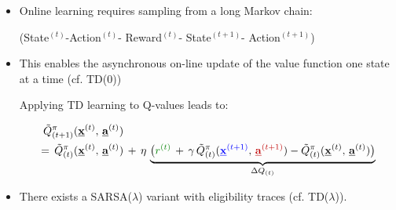 \begin{frame}\frametitle{\subsecname}
	\begin{itemize}
		\item Online learning requires sampling from a long Markov chain:\\
		\begin{center}
			(State$^{(t)}$-Action$^{(t)}$-{\color{reward} Reward$^{(t)}$}-{\color{trans} State$^{(t+1)}$}-{\color{policy} Action$^{(t+1)}$})
		\end{center}
		\vspace{2mm}
		\item This enables the asynchronous on-line update of the value function one state at a time (cf. TD($0$))
		
		\slidesonly{\vspace{-7mm}}
		
		\slidesonly{\vspace{-3mm}}
	
		Applying TD learning to Q-values leads to:
		
		\slidesonly{\vspace{-4mm}}
	
		\begin{align}
			\tilde{Q}^\pi_{(t+1)}(\vec x^{(t)},\, \vec a^{(t)} ) &\\
			 = \, \tilde{Q}^\pi_{(t)} ( \vec x^{(t)},\, \vec a^{(t)} )& \, + \, \eta \, \underbrace{ \big( {\color{reward} r^{(t)}} \, + \, \gamma \, \tilde{Q}^\pi_{(t)} ({\color{trans}  \vec x^{(t+1)}},\,{\color{policy}  \vec a^{(t+1)}} ) - \tilde{Q}^\pi_{(t)} ( \vec x^{(t)},\, \vec a^{(t)} ) \big)}_{\Delta Q_{(t)}} \nonumber
		\end{align}
		
		\slidesonly{\vspace{-3mm}}
		
		\item There exists a SARSA($\lambda$) variant with eligibility traces (cf. TD($\lambda$)).
	\end{itemize}

\end{frame}

